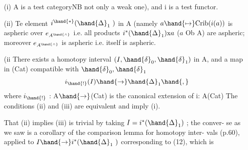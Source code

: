 (i)  A is a test category\hand{(}NB not only a weak one),  and i is a  test
functor.

(ii)  Te element $i^{\hand{\ensuremath{*}}}(\hand{\ensuremath{\Delta}}_{1}\ )$ in A\hand{\ensuremath{^{\wedge}}} (namely  $a\hand{\ensuremath{\mapsto}}\mathrm{Crib}(i(a))$ is aspheric
over $e_{A^{\hand{\wedge}}}$  i.e. all products  $i^{*}(\hand{\ensuremath{\Delta}}_{1})\mathrm{x}a$  ($a$ \hand{\ensuremath{\in}} Ob A) are aspheric;
moreover $e_{A^{\hand{\wedge}}}$  is aspheric i.e.    itself is aspheric.

(ii\over[typed]{)}{)}  There exists a homotopy interval  $(I,\hand{\ensuremath{\delta}}_{0},\hand{\ensuremath{\delta}}_{1})$ in A\hand{\ensuremath{^{\wedge}}}, and a map
in (Cat)  compatible with $\hand{\ensuremath{\delta}}_{0},\hand{\ensuremath{\delta}}_{1}$
 \[ i_{\hand{!}}(I)\hand{\to}\hand{\ensuremath{\Delta}}_{1}\hand{,} \]
where $i_{\hand{!}}$ : A\hand{\ensuremath{^{\wedge}}}$\hand{\to}$(Cat)  is the canonical extension of i: A\hand{\ensuremath{\to}}(Cat)\hand{;}
The conditions  (ii)  and (iii) are equivalent and imply (i).

That (ii) implies (iii) is trivial by taking $I = i^{*}(\hand{\ensuremath{\Delta}}_{1})$ ;  the conver-%
se\hand{,} as we saw\hand{,} is a corollary of the comparison lemma for homotopy inter-%
vals  (p.60),  applied to  $I\hand{\ensuremath{\to}}i^{*}(\hand{\ensuremath{\Delta}}_{1}\ )$  corresponding to (12),  which is
